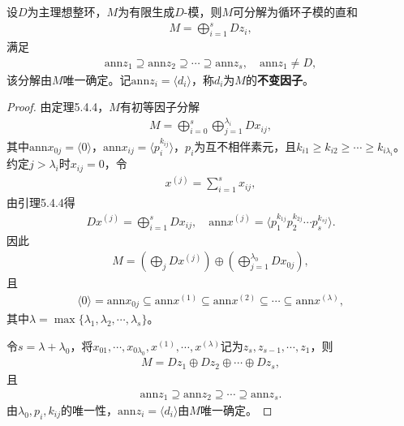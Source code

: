 \documentclass[../../main.tex]{subfiles}%
\begin{document}
\begin{theorem}
设$D$为主理想整环，$M$为有限生成$D$-模，则$M$可分解为循环子模的直和
\begin{align*}
M=\bigoplus\limits_{i=1}^{s}Dz_i,
\end{align*}
满足
\begin{align*}
\mathrm{ann}z_1\supseteq\mathrm{ann}z_2\supseteq\cdots\supseteq\mathrm{ann}z_s,\quad \mathrm{ann}z_1\neq D,
\end{align*}
该分解由$M$唯一确定。记$\mathrm{ann}z_i=\langle d_i\rangle$，称$d_i$为$M$的\textbf{不变因子}。
\end{theorem}
\begin{proof}
由定理5.4.4，$M$有初等因子分解
\begin{align*}
M=\bigoplus\limits_{i=0}^{s}\bigoplus\limits_{j=1}^{\lambda_i}Dx_{ij},
\end{align*}
其中$\mathrm{ann}x_{0j}=\langle0\rangle$，$\mathrm{ann}x_{ij}=\langle p_i^{k_{ij}}\rangle$，$p_i$为互不相伴素元，且$k_{i1}\geqslant k_{i2}\geqslant\cdots\geqslant k_{i\lambda_i}$。
约定$j>\lambda_i$时$x_{ij}=0$，令
\begin{align*}
x^{(j)}=\sum\limits_{i=1}^{s}x_{ij},
\end{align*}
由引理5.4.4得
\begin{align*}
Dx^{(j)}=\bigoplus\limits_{i=1}^{s}Dx_{ij},\quad \mathrm{ann}x^{(j)}=\langle p_1^{k_{1j}}p_2^{k_{2j}}\cdots p_s^{k_{sj}}\rangle.
\end{align*}
因此
\begin{align*}
M=\left(\bigoplus\limits_{j}Dx^{(j)}\right)\oplus\left(\bigoplus\limits_{j=1}^{\lambda_0}Dx_{0j}\right),
\end{align*}
且
\begin{align*}
\langle0\rangle=\mathrm{ann}x_{0j}\subseteq\mathrm{ann}x^{(1)}\subseteq\mathrm{ann}x^{(2)}\subseteq\cdots\subseteq\mathrm{ann}x^{(\lambda)},
\end{align*}
其中$\lambda=\max\{\lambda_1,\lambda_2,\cdots,\lambda_s\}$。

令$s=\lambda+\lambda_0$，将$x_{01},\cdots,x_{0\lambda_0},x^{(1)},\cdots,x^{(\lambda)}$记为$z_s,z_{s-1},\cdots,z_1$，则
\begin{align*}
M=Dz_1\oplus Dz_2\oplus\cdots\oplus Dz_s,
\end{align*}
且
\begin{align*}
\mathrm{ann}z_1\supseteq\mathrm{ann}z_2\supseteq\cdots\supseteq\mathrm{ann}z_s.
\end{align*}
由$\lambda_0,p_i,k_{ij}$的唯一性，$\mathrm{ann}z_i=\langle d_i\rangle$由$M$唯一确定。
\end{proof}
\end{document}
